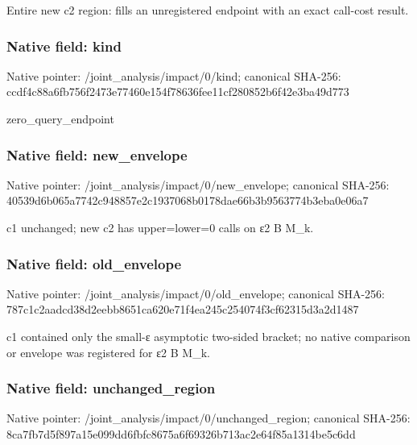 \documentclass[10pt,a4paper]{article}
\begin{document}
\begingroup\raggedright\sloppy Entire new c2 region:\allowbreak{} fills an unregistered endpoint with an exact call-cost result.\par\endgroup

\subsubsection{Native field: kind}
Native pointer: /joint\_\allowbreak{}analysis/impact/0/kind; canonical SHA-256: ccdf4c88a6fb756f2473e77460e154f78636fee11cf280852b6f42e3ba49d773

\begingroup\raggedright\sloppy zero\_\allowbreak{}query\_\allowbreak{}endpoint\par\endgroup

\subsubsection{Native field: new\_\allowbreak{}envelope}
Native pointer: /joint\_\allowbreak{}analysis/impact/0/new\_\allowbreak{}envelope; canonical SHA-256: 40539d6b065a7742c948857e2c1937068b0178dae66b3b9563774b3eba0e06a7

\begingroup\raggedright\sloppy c1 unchanged;\allowbreak{} new c2 has upper=\allowbreak{}lower=\allowbreak{}0 calls on {\AtlasUnicodeText ε}\allowbreak{}2 B M\_\allowbreak{}k.\par\endgroup

\subsubsection{Native field: old\_\allowbreak{}envelope}
Native pointer: /joint\_\allowbreak{}analysis/impact/0/old\_\allowbreak{}envelope; canonical SHA-256: 787c1c2aadcd38d2eebb8651ca620e71f4ea245c254074f3cf62315d3a2d1487

\begingroup\raggedright\sloppy c1 contained only the small-{\AtlasUnicodeText ε}\allowbreak{} asymptotic two-sided bracket;\allowbreak{} no native comparison or envelope was registered for {\AtlasUnicodeText ε}\allowbreak{}2 B M\_\allowbreak{}k.\par\endgroup

\subsubsection{Native field: unchanged\_\allowbreak{}region}
Native pointer: /joint\_\allowbreak{}analysis/impact/0/unchanged\_\allowbreak{}region; canonical SHA-256: 8ca7fb7d5f897a15e099dd6fbfc8675a6f69326b713ac2e64f85a1314be5c6dd
\end{document}
